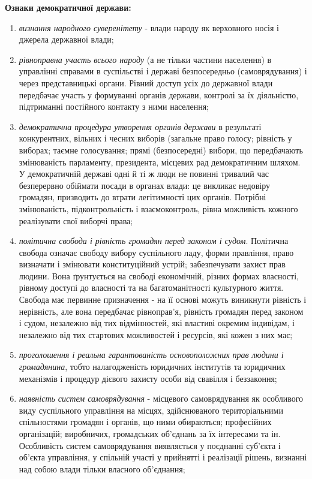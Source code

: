 \noindent\textbf{Ознаки демократичної держави:}
\begin{enumerate}
\item \textit{визнання народного суверенітету} - влади народу як верховного носія і джерела державної влади;
\item \textit{рівноправна участь всього народу} (а не тільки частини населення) в управлінні справами в суспільстві і державі безпосередньо (самоврядування) і через представницькі органи. Рівний доступ усіх до державної влади передбачає участь у формуванні органів держави, контролі за їх діяльністю, підтриманні постійного контакту з ними населення;
\item \textit{демократична процедура утворення органів держави} в результаті конкурентних, вільних і чесних виборів (загальне право голосу; рівність у виборах; таємне голосування; прямі (безпосередні) вибори, що передбачають змінюваність парламенту, президента, місцевих рад демократичним шляхом. У демократичній державі одні й ті ж люди не повинні тривалий час безперервно обіймати посади в органах влади: це викликає недовіру громадян, призводить до втрати легітимності цих органів. Потрібні змінюваність, підконтрольність і взаємоконтроль, рівна можливість кожного реалізувати свої виборчі права;
\item \textit{політична свобода і рівність громадян перед законом і судом}. Політична свобода означає свободу вибору суспільного ладу, форми правління, право визначати і змінювати конституційний устрій; забезпечувати захист прав людини. Вона ґрунтується на свободі економічній, різних формах власності, рівному доступі до власності та на багатоманітності культурного життя. Свобода має первинне призначення - на її основі можуть виникнути рівність і нерівність, але вона передбачає рівноправ'я, рівність громадян перед законом і судом, незалежно від тих відмінностей, які властиві окремим індивідам, і незалежно від тих стартових можливостей і ресурсів, які кожен з них має;
\item \textit{проголошення і реальна гарантованість основоположних прав людини і громадянина}, тобто налагодженість юридичних інститутів та юридичних механізмів і процедур дієвого захисту особи від свавілля і беззаконня;
\item \textit{наявність систем самоврядування} - місцевого самоврядування як особливого виду суспільного управління на місцях, здійснюваного територіальними спільностями громадян і органів, що ними обираються; професійних організацій; виробничих, громадських об'єднань за їх інтересами та ін. Особливість систем самоврядування виявляється у поєднанні суб'єкта і об'єкта управління, у спільній участі у прийнятті і реалізації рішень, визнанні над собою влади тільки власного об'єднання;

\end{enumerate}
